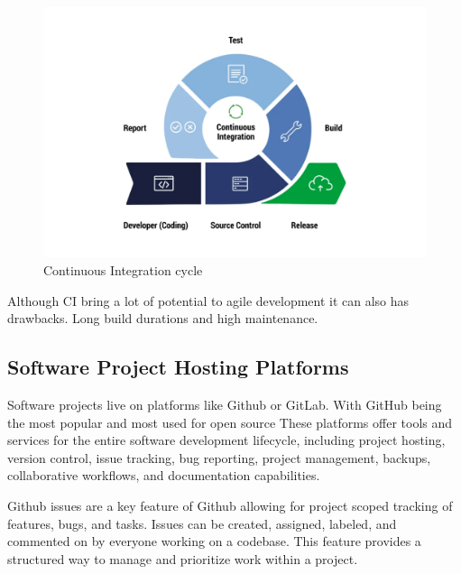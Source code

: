 \begin{figure}[H]
    \centering
    \includegraphics[width=1\textwidth]{images/ci-cycle.png}
    \caption{Continuous Integration cycle}
    \label{fig:ci-cycle}
\end{figure}

Although CI bring a lot of potential to agile development it can also has drawbacks. Long build durations and high maintenance. %

\subsection{Software Project Hosting Platforms} \label{subsection:Software Project Hosting Platforms}

Software projects live on platforms like Github or GitLab. With GitHub being the most popular and most used for open source %
These platforms offer tools and services for the entire software development lifecycle, including project hosting, version control, issue tracking, bug reporting, project management, backups, collaborative workflows, and documentation capabilities. \cite{abrahamssonAgileSoftwareDevelopment2017}

Github issues are a key feature of Github allowing for project scoped tracking of features, bugs, and tasks. Issues can be created, assigned, labeled, and commented on by everyone working on a codebase. This feature provides a structured way to manage and prioritize work within a project.

